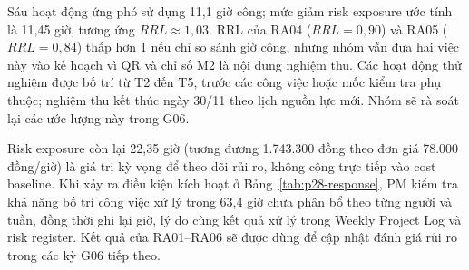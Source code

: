Sáu hoạt động ứng phó sử dụng 11,1 giờ công; mức giảm risk exposure ước tính là 11,45 giờ, tương ứng $RRL \approx 1{,}03$. RRL của RA04 ($RRL = 0{,}90$) và RA05 ($RRL = 0{,}84$) thấp hơn 1 nếu chỉ so sánh giờ công, nhưng nhóm vẫn đưa hai việc này vào kế hoạch vì QR và chỉ số M2 là nội dung nghiệm thu. Các hoạt động thử nghiệm được bố trí từ T2 đến T5, trước các công việc hoặc mốc kiểm tra phụ thuộc; nghiệm thu kết thúc ngày 30/11 theo lịch nguồn lực mới. Nhóm sẽ rà soát lại các ước lượng này trong G06.

Risk exposure còn lại 22,35 giờ (tương đương 1.743.300 đồng theo đơn giá 78.000 đồng/giờ) là giá trị kỳ vọng để theo dõi rủi ro, không cộng trực tiếp vào cost baseline. Khi xảy ra điều kiện kích hoạt ở Bảng~\ref{tab:p28-response}, PM kiểm tra khả năng bố trí công việc xử lý trong 63,4 giờ chưa phân bổ theo từng người và tuần, đồng thời ghi lại giờ, lý do cùng kết quả xử lý trong Weekly Project Log và risk register. Kết quả của RA01--RA06 sẽ được dùng để cập nhật đánh giá rủi ro trong các kỳ G06 tiếp theo.